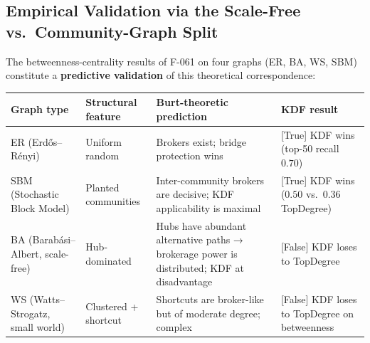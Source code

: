 \subsection{Empirical Validation via the Scale-Free vs.~Community-Graph Split}\label{empirical-validation-via-the-scale-free-vs.-community-graph-split}

The betweenness-centrality results of F-061 on four graphs (ER, BA, WS, SBM) constitute a \textbf{predictive validation} of this theoretical correspondence:

{\def\LTcaptype{none} %
\begin{longtable}[]{@{}
  >{\raggedright\arraybackslash}p{}
  >{\raggedright\arraybackslash}p{}
  >{\raggedright\arraybackslash}p{}
  >{\raggedright\arraybackslash}p{}@{}}
\toprule\noalign{}
\begin{minipage}[b]{\linewidth}\raggedright
Graph type
\end{minipage} & \begin{minipage}[b]{\linewidth}\raggedright
Structural feature
\end{minipage} & \begin{minipage}[b]{\linewidth}\raggedright
Burt-theoretic prediction
\end{minipage} & \begin{minipage}[b]{\linewidth}\raggedright
KDF result
\end{minipage} \\
\midrule\noalign{}
\endhead
\bottomrule\noalign{}
\endlastfoot
ER (Erdős--Rényi) & Uniform random & Brokers exist; bridge protection wins & {[}True{]} KDF wins (top-50 recall \(0.70\)) \\
SBM (Stochastic Block Model) & Planted communities & Inter-community brokers are decisive; KDF applicability is maximal & {[}True{]} KDF wins (\(0.50\) vs.~\(0.36\) TopDegree) \\
BA (Barabási--Albert, scale-free) & Hub-dominated & Hubs have abundant alternative paths → brokerage power is distributed; KDF at disadvantage & {[}False{]} KDF loses to TopDegree \\
WS (Watts--Strogatz, small world) & Clustered + shortcut & Shortcuts are broker-like but of moderate degree; complex & {[}False{]} KDF loses to TopDegree on betweenness \\
\end{longtable}
}

